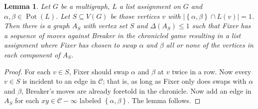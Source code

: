 \documentclass[12pt]{amsart}
\theoremstyle{plain}
\newtheorem{lem}[thm]{Lemma}
\theoremstyle{definition}
\theoremstyle{remark}
\newcommand{\fancy}[1]{\mathcal{#1}}
\newcommand{\C}[1]{\fancy{C}_{#1}}
\newcommand{\set}[1]{\left\{ #1 \right\}}
\newcommand{\card}[1]{\left|#1\right|}
\newcommand{\pot}{\operatorname{Pot}}
\renewcommand{\C}{\fancy{C}}
\begin{document}
\begin{lem}\label{MultiMoveCombination}
Let $G$ be a multigraph, $L$ a list assignment on $G$ and $\alpha, \beta \in \pot(L)$. Let $S \subseteq V(G)$ be those vertices $v$ with $\card{\set{\alpha, \beta} \cap L(v)} = 1$.  Then there is a graph $A_S$ with vertex set $S$ and $\Delta(A_S) \le 1$ such that Fixer has a sequence of moves against Breaker in the chronicled game resulting in a list assignment where Fixer has chosen to swap $\alpha$ and $\beta$ all or none of the vertices in each component of $A_S$.
\end{lem}
\begin{proof}
For each $v \in S$, Fixer should swap $\alpha$ and $\beta$ at $v$ twice in a row.  Now every $v \in S$ is incident to an edge in $\C$; that is, as long as Fixer only does swaps with $\alpha$ and $\beta$, Breaker's moves are already foretold in the chronicle.  Now add an edge in $A_S$ for each $xy \in \C - \infty$ labeled $\set{\alpha, \beta}$. The lemma follows.
\end{proof}
\end{document}
